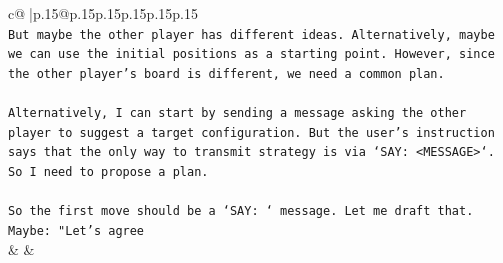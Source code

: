 \documentclass{article}
\begin{document}
{\begin{supertabular}{c@{$\;$}|p{.15\linewidth}@{}p{.15\linewidth}p{.15\linewidth}p{.15\linewidth}p{.15\linewidth}p{.15\linewidth}}
{{{\\ 
\texttt{But maybe the other player has different ideas. Alternatively, maybe we can use the initial positions as a starting point. However, since the other player's board is different, we need a common plan.} \\
\\ 
\texttt{Alternatively, I can start by sending a message asking the other player to suggest a target configuration. But the user's instruction says that the only way to transmit strategy is via `SAY: <MESSAGE>`. So I need to propose a plan.} \\
\\ 
\texttt{So the first move should be a `SAY: ` message. Let me draft that. Maybe: "Let's agree} \\
            }
        }
    }
    & & \\ \\


\end{supertabular}}
\end{document}
